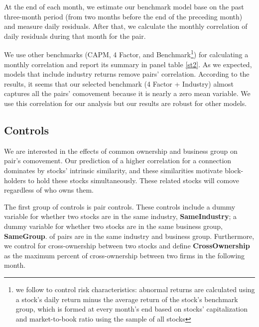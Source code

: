 	At the end of each month, we estimate our benchmark model base on the past three-month period (from two months before the end of the preceding month) and measure daily residuals.  After that, we calculate the monthly correlation of daily residuals during that month for the pair.
	
	We use other benchmarks (CAPM, 4 Factor, and Benchmark\footnote{we follow \cite{daniel1997measuring} to control risk characteristics: abnormal returns are calculated using a stock’s daily return minus the average return of
	the stock’s benchmark group, which is formed at every month’s end based on stocks’ capitalization and market-to-book ratio using the sample of all stocks}) for calculating a monthly correlation and report its summary in panel  table \ref{st2}. 
	As we expected,  models that include industry returns remove pairs' correlation. According to the results, it seems that our selected benchmark (4 Factor + Industry) almost captures all the pairs' comovement because it is nearly a zero mean variable. We use this correlation for our analysis but our results are robust for other models.
	
	
	
	
%			



\FloatBarrier


\subsection{Controls}

We are interested in the effects of common ownership and business group on pair's comovement.
Our prediction of a higher correlation for a connection dominates by stocks' intrinsic similarity, and these similarities motivate block-holders to hold these stocks simultaneously. These related stocks will comove regardless of who owns them.

The first group of controls is pair controls. These controls include
a dummy variable for whether two stocks are in the same industry, \textbf{SameIndustry}; a dummy variable for whether two stocks are in the same business group, \textbf{SameGroup}.
of pairs are in the same industry and business group. Furthermore, we control for cross-ownership between two stocks and define  \textbf{CrossOwnership} as the maximum percent of cross-ownership between two firms in the following month.


